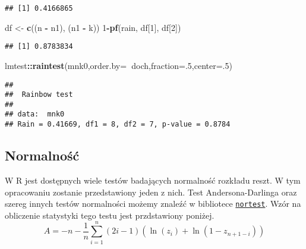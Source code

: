 \documentclass[polish,]{book}
\newenvironment{Shaded}{\begin{snugshade}}{\end{snugshade}}
\newcommand{\DataTypeTok}[1]{\textcolor[rgb]{0.13,0.29,0.53}{#1}}
\newcommand{\DecValTok}[1]{\textcolor[rgb]{0.00,0.00,0.81}{#1}}
\newcommand{\KeywordTok}[1]{\textcolor[rgb]{0.13,0.29,0.53}{\textbf{#1}}}
\newcommand{\NormalTok}[1]{#1}
\newcommand{\OperatorTok}[1]{\textcolor[rgb]{0.81,0.36,0.00}{\textbf{#1}}}
\newcommand{\StringTok}[1]{\textcolor[rgb]{0.31,0.60,0.02}{#1}}
\begin{document}
\begin{verbatim}
## [1] 0.4166865
\end{verbatim}

\begin{Shaded}
\begin{Highlighting}[]
\NormalTok{df <-}\StringTok{ }\KeywordTok{c}\NormalTok{((n }\OperatorTok{-}\StringTok{ }\NormalTok{n1), (n1 }\OperatorTok{-}\StringTok{ }\NormalTok{k))}
\DecValTok{1}\OperatorTok{-}\KeywordTok{pf}\NormalTok{(rain, df[}\DecValTok{1}\NormalTok{], df[}\DecValTok{2}\NormalTok{])}
\end{Highlighting}
\end{Shaded}

\begin{verbatim}
## [1] 0.8783834
\end{verbatim}

\begin{Shaded}
\begin{Highlighting}[]
\NormalTok{lmtest}\OperatorTok{::}\KeywordTok{raintest}\NormalTok{(mnk0,}\DataTypeTok{order.by=}\OperatorTok{~}\NormalTok{doch,}\DataTypeTok{fraction=}\NormalTok{.}\DecValTok{5}\NormalTok{,}\DataTypeTok{center=}\NormalTok{.}\DecValTok{5}\NormalTok{)}
\end{Highlighting}
\end{Shaded}

\begin{verbatim}
## 
##  Rainbow test
## 
## data:  mnk0
## Rain = 0.41669, df1 = 8, df2 = 7, p-value = 0.8784
\end{verbatim}

\hypertarget{part_13.2.3}{%
\subsection{Normalność}\label{part_13.2.3}}

W R jest dostępnych wiele testów badających normalność rozkładu reszt. W tym
opracowaniu zostanie przedstawiony jeden z nich. Test Andersona-Darlinga oraz
szereg innych testów normalności możemy znaleźć w bibliotece \href{https://rdrr.io/cran/nortest/}{\texttt{nortest}}. Wzór na obliczenie statystyki tego testu jest przdstawiony poniżej.
\begin{equation}
A=-n-\frac{1}{n}\sum_{i=1}^n(2i-1)\left(\ln(z_i)+\ln(1-z_{n+1-i})\right)
\label{eq:wz1310}
\end{equation}
\end{document}
